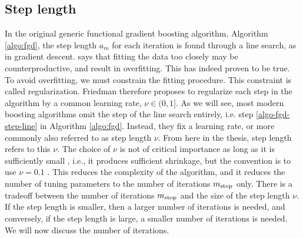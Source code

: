 \subsection{Step length}
In the original generic functional gradient boosting algorithm, Algorithm \ref{algo:fgd}, the step length $a_m$ for each iteration is found through a line search, as in gradient descent.
\citet{friedman2001} says that fitting the data too closely may be counterproductive, and result in overfitting.
This has indeed proven to be true.
To avoid overfitting, we must constrain the fitting procedure.
This constraint is called regularization.
Friedman therefore proposes to regularize each step in the algorithm by a common learning rate, $\nu\in(0,1]$.
As we will see, most modern boosting algorithms omit the step of the line search entirely, i.e. step \ref{algo-fgd-step-line} in Algorithm \ref{algo:fgd}.
Instead, they fix a learning rate, or more commonly also referred to as step length $\nu$.
From here in the thesis, step length refers to this $\nu$.
The choice of $\nu$ is not of critical importance as long as it is sufficiently small \citep{schmid-hothorn}, i.e., it produces sufficient shrinkage, but the convention is to use $\nu=0.1$ \citep{mayr14a}.
This reduces the complexity of the algorithm, and it reduces the number of tuning parameters to the number of iterations $m_{\text{stop}}$ only.
There is a tradeoff between the number of iterations $m_{\text{stop}}$ and the size of the step length $\nu$.
If the step length is smaller, then a larger number of iterations is needed, and conversely, if the step length is large, a smaller number of iterations is needed.
We will now discuss the number of iterations.

